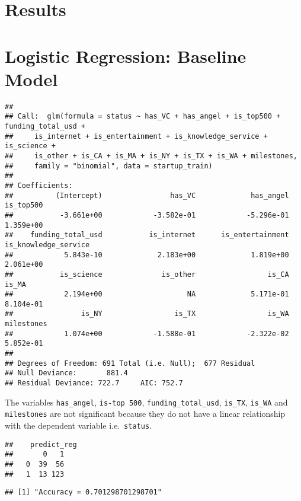 \documentclass[
]{article}
\begin{document}
\hypertarget{results}{%
\section{Results}\label{results}}

\hypertarget{logistic-regression-baseline-model}{%
\section{Logistic Regression: Baseline
Model}\label{logistic-regression-baseline-model}}

\begin{verbatim}
## 
## Call:  glm(formula = status ~ has_VC + has_angel + is_top500 + funding_total_usd + 
##     is_internet + is_entertainment + is_knowledge_service + is_science + 
##     is_other + is_CA + is_MA + is_NY + is_TX + is_WA + milestones, 
##     family = "binomial", data = startup_train)
## 
## Coefficients:
##          (Intercept)                has_VC             has_angel             is_top500  
##           -3.661e+00            -3.582e-01            -5.296e-01             1.359e+00  
##    funding_total_usd           is_internet      is_entertainment  is_knowledge_service  
##            5.843e-10             2.183e+00             1.819e+00             2.061e+00  
##           is_science              is_other                 is_CA                 is_MA  
##            2.194e+00                    NA             5.171e-01             8.104e-01  
##                is_NY                 is_TX                 is_WA            milestones  
##            1.074e+00            -1.588e-01            -2.322e-02             5.852e-01  
## 
## Degrees of Freedom: 691 Total (i.e. Null);  677 Residual
## Null Deviance:       881.4 
## Residual Deviance: 722.7     AIC: 752.7
\end{verbatim}

The variables \texttt{has\_angel}, \texttt{is-top\ 500},
\texttt{funding\_total\_usd}, \texttt{is\_TX}, \texttt{is\_WA} and
\texttt{milestones} are not significant because they do not have a
linear relationship with the dependent variable i.e.~\texttt{status}.

\begin{verbatim}
##    predict_reg
##       0   1
##   0  39  56
##   1  13 123
\end{verbatim}

\begin{verbatim}
## [1] "Accuracy = 0.701298701298701"
\end{verbatim}
\end{document}
